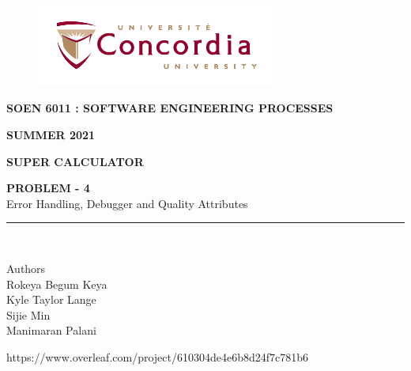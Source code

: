 \documentclass[a4paper, 11pt]{report}
\begin{document}
\begin{titlepage}
\vspace*{0.7in}
\begin{center}
\begin{figure}[htb]
\begin{center}
\includegraphics[width=8cm]{univ_logo}
\end{center}
\end{figure}
\vspace*{0.3in}
\begin{Large}
\textbf{SOEN 6011 : SOFTWARE ENGINEERING PROCESSES} \\
\end{Large}
\vspace*{0.1in}
\begin{Large}
\textbf{SUMMER 2021} \\
\end{Large}
\vspace*{0.9in}
\begin{Large}
\textbf{SUPER CALCULATOR} \\
\end{Large}
\vspace*{0.9in}
\begin{Large} 


\textbf{PROBLEM - 4} \\
Error Handling, Debugger and Quality Attributes\\
\end{Large}
\vspace*{0.9in}
\rule{80mm}{0.1mm}\\
\vspace*{0.1in}
\begin{large}
Authors \\
\vspace*{0.1in}
Rokeya Begum Keya\\
\vspace*{0.1in}
Kyle Taylor Lange\\
\vspace*{0.1in}
Sijie Min\\
\vspace*{0.1in}
Manimaran Palani\\ 
\vspace*{0.3in}
\date{\normalsize\today} 
\end{large}
\end{center}
\begin{center}
https://www.overleaf.com/project/610304de4e6b8d24f7c781b6\end{center}
\end{titlepage}
\pagebreak
\end{document}
